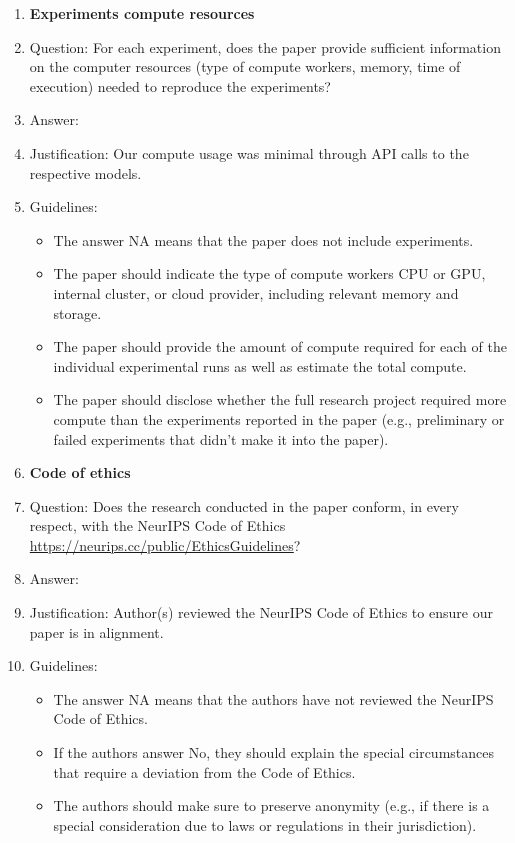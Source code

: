 \documentclass{article}
\begin{document}
\begin{enumerate}
\item {\bf Experiments compute resources}
    \item[] Question: For each experiment, does the paper provide sufficient information on the computer resources (type of compute workers, memory, time of execution) needed to reproduce the experiments?
    \item[] Answer: \answerYes{} %
    \item[] Justification: Our compute usage was minimal through API calls to the respective models.
    \item[] Guidelines:
    \begin{itemize}
        \item The answer NA means that the paper does not include experiments.
        \item The paper should indicate the type of compute workers CPU or GPU, internal cluster, or cloud provider, including relevant memory and storage.
        \item The paper should provide the amount of compute required for each of the individual experimental runs as well as estimate the total compute. 
        \item The paper should disclose whether the full research project required more compute than the experiments reported in the paper (e.g., preliminary or failed experiments that didn't make it into the paper). 
    \end{itemize}
    
\item {\bf Code of ethics}
    \item[] Question: Does the research conducted in the paper conform, in every respect, with the NeurIPS Code of Ethics \url{https://neurips.cc/public/EthicsGuidelines}?
    \item[] Answer: \answerYes{} %
    \item[] Justification: Author(s) reviewed the NeurIPS Code of Ethics to ensure our paper is in alignment.
    \item[] Guidelines:
    \begin{itemize}
        \item The answer NA means that the authors have not reviewed the NeurIPS Code of Ethics.
        \item If the authors answer No, they should explain the special circumstances that require a deviation from the Code of Ethics.
        \item The authors should make sure to preserve anonymity (e.g., if there is a special consideration due to laws or regulations in their jurisdiction).
    \end{itemize}



\end{enumerate}
\end{document}
